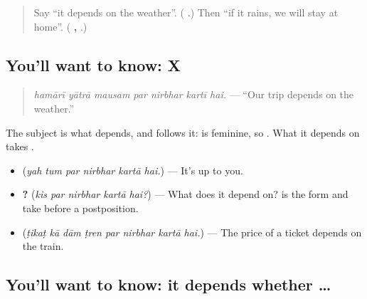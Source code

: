 \label{lesson:HI-C287-nirbharkartahai}



\begin{quote}
Say \textquotedblleft{}it depends on the weather\textquotedblright{}. (\textbf{     }.) Then \textquotedblleft{}if it rains, we will stay at home\textquotedblright{}. (\textbf{  ,     }.)
\end{quote}

\subsection*{You'll want to know: X    }
\begin{quote}
\textbf{      }
\end{quote}

\begin{quote}
\emph{hamārī yātrā mausam par nirbhar kartī hai.} — \textquotedblleft{}Our trip depends on the weather.\textquotedblright{}
\end{quote}

The subject is what depends, and \textbf{} follows it: \textbf{} is feminine, so \textbf{ }. What it depends on takes \textbf{}.

\begin{itemize}
\raggedright
  \item \textbf{     } (\emph{yah tum par nirbhar kartā hai.}) — It's up to you.
  \item \textbf{    ?} (\emph{kis par nirbhar kartā hai?}) — What does it depend on? \textbf{} is the form \textbf{} and \textbf{} take before a postposition.
  \item \textbf{       } (\emph{ṭikaṭ kā dām ṭren par nirbhar kartā hai.}) — The price of a ticket depends on the train.
\end{itemize}

\subsection*{You'll want to know: it depends whether …}
\begin{quote}
\textbf{          }
\end{quote}

